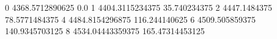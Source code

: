 0 4368.5712890625 0.0
1 4404.3115234375 35.740234375
2 4447.1484375 78.5771484375
4 4484.8154296875 116.244140625
6 4509.505859375 140.9345703125
8 4534.04443359375 165.47314453125
